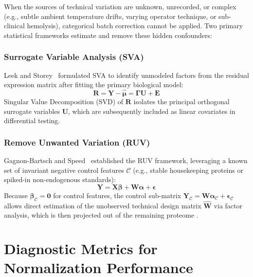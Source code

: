 \documentclass[11pt,oneside]{book}
\begin{document}
When the sources of technical variation are unknown, unrecorded, or complex (e.g., subtle ambient temperature drifts, varying operator technique, or sub-clinical hemolysis), categorical batch correction cannot be applied. Two primary statistical frameworks estimate and remove these hidden confounders:

\subsubsection{Surrogate Variable Analysis (SVA)}
Leek and Storey~\cite{leek2007capturing} formulated SVA to identify unmodeled factors from the residual expression matrix after fitting the primary biological model:
\begin{equation}
\mathbf{R} = \mathbf{Y} - \hat{\boldsymbol{\mu}} = \boldsymbol{\Gamma} \mathbf{U} + \mathbf{E}
\end{equation}
Singular Value Decomposition (SVD) of $\mathbf{R}$ isolates the principal orthogonal surrogate variables $\mathbf{U}$, which are subsequently included as linear covariates in differential testing.

\subsubsection{Remove Unwanted Variation (RUV)}
Gagnon-Bartsch and Speed~\cite{gagnon2012using} established the RUV framework, leveraging a known set of invariant negative control features $\mathcal{C}$ (e.g., stable housekeeping proteins or spiked-in non-endogenous standards):
\begin{equation}
\mathbf{Y} = \mathbf{X}\boldsymbol{\beta} + \mathbf{W}\boldsymbol{\alpha} + \boldsymbol{\epsilon}
\end{equation}
Because $\boldsymbol{\beta}_{\mathcal{C}} = \mathbf{0}$ for control features, the control sub-matrix $\mathbf{Y}_{\mathcal{C}} = \mathbf{W}\boldsymbol{\alpha}_{\mathcal{C}} + \boldsymbol{\epsilon}_{\mathcal{C}}$ allows direct estimation of the unobserved technical design matrix $\hat{\mathbf{W}}$ via factor analysis, which is then projected out of the remaining proteome \cite{risso2014normalization}.

\section{Diagnostic Metrics for Normalization Performance}
\end{document}
